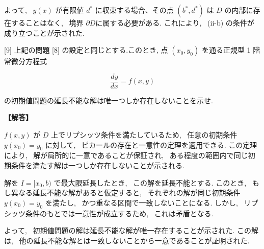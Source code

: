 \documentclass{jsarticle}
\begin{document}
よって, \ $y(x)$ が有限値 $d^*$ に収束する場合、その点 $(b^*, d^*)$ は $D$ の内部に存在することはなく, \ 境界 $\partial D$に属する必要がある. これにより, \ (ii-b) の条件が成り立つことが示された.



\begin{itembox}[l]{[9]}
上記の問題 [8] の設定と同じとする.このとき, 点 $\left(x_{0}, y_{0}\right)$ を通る正規型 1 階常微分方程式


\begin{equation*}
\frac{d y}{d x}=f(x, y) \tag{21}
\end{equation*}


の初期値問題の延長不能な解は唯一つしか存在しないことを示せ.\\
  
\end{itembox}

\noindent
\textbf{【解答】}

$f(x,y)$ が $D$ 上でリプシッツ条件を満たしているため, \ 任意の初期条件 
$y(x_0) = y_0$ に対して, \ ピカールの存在と一意性の定理を適用できる. この定理により, \ 解が局所的に一意であることが保証され, \ ある程度の範囲内で同じ初期条件を満たす解は一つしか存在しないことが示される.

解を $I = [x_0, b)$ で最大限延長したとき, \ この解を延長不能とする. このとき, \ もし異なる延長不能な解があると仮定すると, \ それぞれの解が同じ初期条件 
$y(x_0) = y_0$ を満たし, \ かつ重なる区間で一致しないことになる. しかし, \ リプシッツ条件のもとでは一意性が成立するため, \ これは矛盾となる.

よって, \ 初期値問題の解は延長不能な解が唯一存在することが示された. この解は, \ 他の延長不能な解とは一致しないことから一意であることが証明された.
\end{document}
